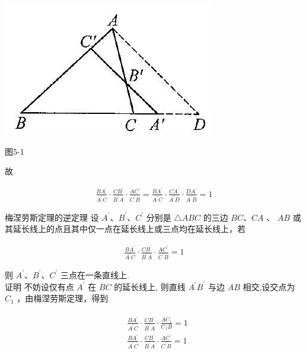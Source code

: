\documentclass[10pt]{article}
\begin{document}
\begin{center}
\includegraphics[max width=\textwidth]{2024_10_30_2c8f45efd4a519b08e1ag-046}
\end{center}

图5-1

故

\begin{align*}
\frac{B A^{\prime}}{A^{\prime} C} \cdot \frac{C B^{\prime}}{B^{\prime} A} \cdot \frac{A C^{\prime}}{C^{\prime} B}=\frac{B A^{\prime}}{A^{\prime} C} \cdot \frac{C A^{\prime}}{A^{\prime} D} \cdot \frac{D A^{\prime}}{A^{\prime} \bar{B}}=1
\end{align*}

梅涅劳斯定理的逆定理 设 $A^{\prime} 、 B^{\prime} 、 C^{\prime}$ 分别是 $\triangle A B C$ 的三边 $B C 、 C A$ 、 $A B$ 或其延长线上的点且其中仅一点在延长线上或三点均在延长线上，若

\begin{align*}
\frac{B A^{\prime}}{A^{\prime} C} \cdot \frac{C B^{\prime}}{B^{\prime} A} \cdot \frac{A C^{\prime}}{C^{\prime} B}=1 \tag{5-2}
\end{align*}

则 $A^{\prime} 、 B^{\prime} 、 C^{\prime}$ 三点在一条直线上.\\
证明 不妨设仅有点 $A^{\prime}$ 在 $B C$ 的延长线上, 则直线 $A^{\prime} B^{\prime}$ 与边 $A B$ 相交,设交点为 $C_{1}$ ，由梅涅劳斯定理，得到

\begin{align*}
\begin{aligned}
& \frac{B A^{\prime}}{A^{\prime} C} \cdot \frac{C B^{\prime}}{B^{\prime} A} \cdot \frac{A C_{1}}{C_{1} B}=1 \\
& \frac{B A^{\prime}}{A^{\prime} C} \cdot \frac{C B^{\prime}}{B^{\prime} A} \cdot \frac{A C^{\prime}}{C^{\prime} B}=1
\end{aligned}
\end{align*}
\end{document}
